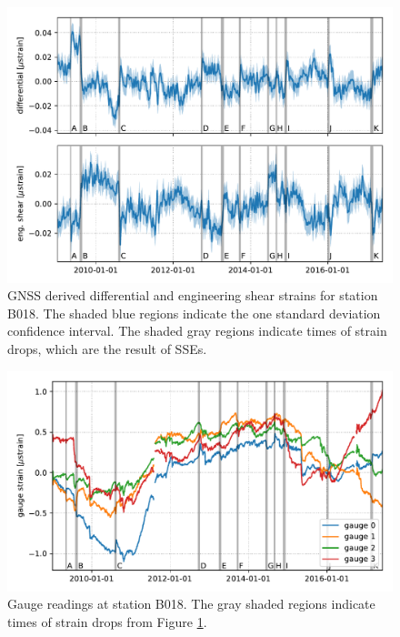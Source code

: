 \documentclass[10pt,a4paper]{article}
\begin{document}
\begin{figure}
\includegraphics{figures/gnss.pdf}
\caption{GNSS derived differential and engineering shear strains for station B018. The shaded blue regions indicate the one standard deviation confidence interval. The shaded gray regions indicate times of strain drops, which are the result of SSEs.}   
\label{fig:Gnss}
\end{figure}

\begin{figure}
\includegraphics{figures/gauge.pdf}
\caption{Gauge readings at station B018. The gray shaded regions indicate times of strain drops from Figure \ref{fig:Gnss}.}   
\label{fig:Gauge}
\end{figure}
\end{document}
